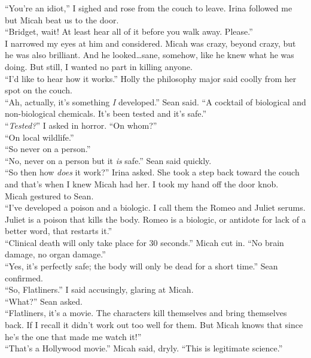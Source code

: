 \documentclass[a5paper]{scrartcl}
\begin{document}
\enquote{You're an idiot,} I sighed and rose from the couch to leave. Irina followed me but Micah beat us to the door.\\
\enquote{Bridget, wait! At least hear all of it before you walk away. Please.}\\
I narrowed my eyes at him and considered. Micah was crazy, beyond crazy, but he was also brilliant. And he looked\dots sane, somehow, like he knew what he was doing. But still, I wanted no part in killing anyone.\\
\enquote{I'd like to hear how it works.} Holly the philosophy major said coolly from her spot on the couch.\\
\enquote{Ah, actually, it's something \textit{I} developed.} Sean said. \enquote{A cocktail of biological and non-biological chemicals. It's been tested and it's safe.}\\
\enquote{\textit{Tested?}} I asked in horror. \enquote{On whom?}\\
\enquote{On local wildlife.}\\
\enquote{So never on a person.}\\
\enquote{No, never on a person but it \textit{is} safe.} Sean said quickly.\\
\enquote{So then how \textit{does} it work?} Irina asked. She took a step back toward the couch and that's when I knew Micah had her. I took my hand off the door knob.\\
Micah gestured to Sean.\\
\enquote{I've developed a poison and a biologic. I call them the Romeo and Juliet serums. Juliet is a poison that kills the body. Romeo is a biologic, or antidote for lack of a better word, that restarts it.}\\
\enquote{Clinical death will only take place for 30 seconds.} Micah cut in. \enquote{No brain damage, no organ damage.}\\
\enquote{Yes, it's perfectly safe; the body will only be dead for a short time.} Sean confirmed.\\
\enquote{So, Flatliners.} I said accusingly, glaring at Micah.\\
\enquote{What?} Sean asked.\\
\enquote{Flatliners, it's a movie. The characters kill themselves and bring themselves back. If I recall it didn't work out too well for them. But Micah knows that since he's the one that made me watch it!}\\
\enquote{That's a Hollywood movie.} Micah said, dryly. \enquote{This is legitimate science.}\\
\end{document}
